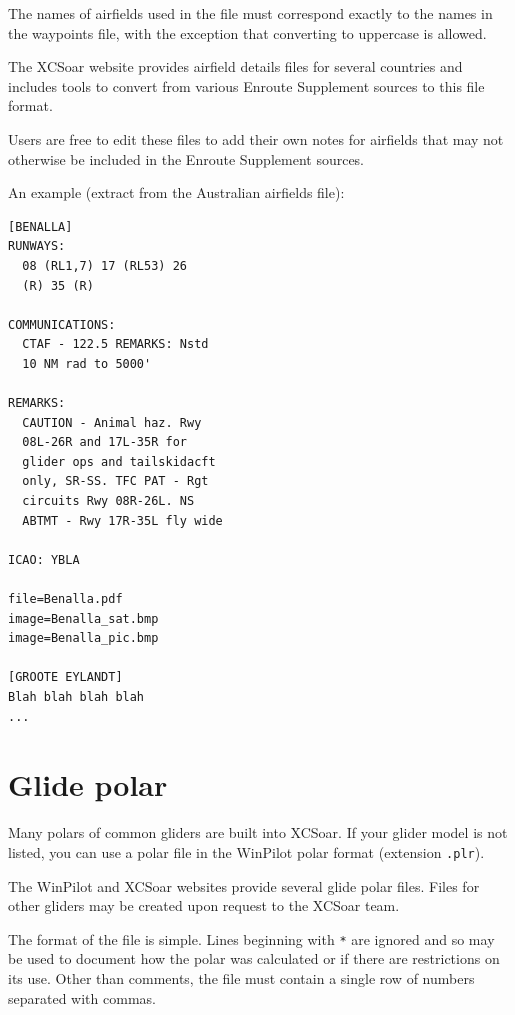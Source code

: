 The names of airfields used in the file must correspond exactly to the
names in the waypoints file, with the exception that converting to
uppercase is allowed.

The XCSoar website provides airfield details files for several
countries and includes tools to convert from various Enroute
Supplement sources to this file format.

Users are free to edit these files to add their own notes for
airfields that may not otherwise be included in the Enroute Supplement
sources.

An example (extract from the Australian airfields file):
\begin{verbatim}
[BENALLA]
RUNWAYS:
  08 (RL1,7) 17 (RL53) 26
  (R) 35 (R)

COMMUNICATIONS:
  CTAF - 122.5 REMARKS: Nstd
  10 NM rad to 5000'

REMARKS:
  CAUTION - Animal haz. Rwy
  08L-26R and 17L-35R for
  glider ops and tailskidacft
  only, SR-SS. TFC PAT - Rgt
  circuits Rwy 08R-26L. NS
  ABTMT - Rwy 17R-35L fly wide

ICAO: YBLA

file=Benalla.pdf
image=Benalla_sat.bmp
image=Benalla_pic.bmp

[GROOTE EYLANDT]
Blah blah blah blah
...
\end{verbatim}

\section{Glide polar} \label{sec:glide-polar}

Many polars of common gliders are built into XCSoar.  If your glider
model is not listed, you can use a polar file in the WinPilot polar
format (extension \verb|.plr|).

The WinPilot and XCSoar websites provide several glide polar files.
Files for other gliders may be created upon request to the XCSoar
team.

The format of the file is simple.  Lines beginning with \verb|*| are
ignored and so may be used to document how the polar was calculated or
if there are restrictions on its use.  Other than comments, the file
must contain a single row of numbers separated with commas.

